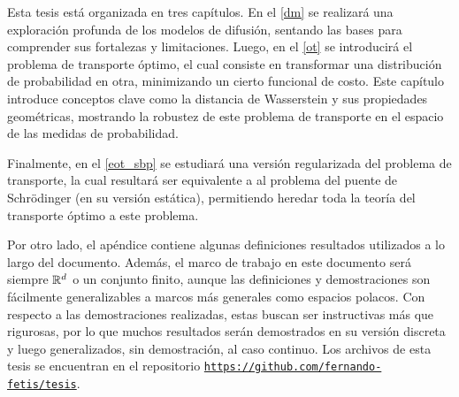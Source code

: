 Esta tesis está organizada en tres capítulos. En el \autoref{dm} se realizará una exploración profunda de los modelos de difusión, sentando las bases para comprender sus fortalezas y limitaciones. Luego, en el \autoref{ot} se introducirá el problema de transporte óptimo, el cual consiste en transformar una distribución de probabilidad en otra, minimizando un cierto funcional de costo. Este capítulo introduce conceptos clave como la distancia de Wasserstein y sus propiedades geométricas, mostrando la robustez de este problema de transporte en el espacio de las medidas de probabilidad.

Finalmente, en el \autoref{eot_sbp} se estudiará una versión regularizada del problema de transporte, la cual resultará ser equivalente a al problema del puente de Schrödinger (en su versión estática), permitiendo heredar toda la teoría del transporte óptimo a este problema.

Por otro lado, el apéndice contiene algunas definiciones resultados utilizados a lo largo del documento. Además, el marco de trabajo en este documento será siempre $\mathbb{R}^d$ o un conjunto finito, aunque las definiciones y demostraciones son fácilmente generalizables a marcos más generales como espacios polacos. Con respecto a las demostraciones realizadas, estas buscan ser instructivas más que rigurosas, por lo que muchos resultados serán demostrados en su versión discreta y luego generalizados, sin demostración, al caso continuo. Los archivos de esta tesis se encuentran en el repositorio \href{https://github.com/fernando-fetis/tesis}{\texttt{https://github.com/fernando-fetis/tesis}}.